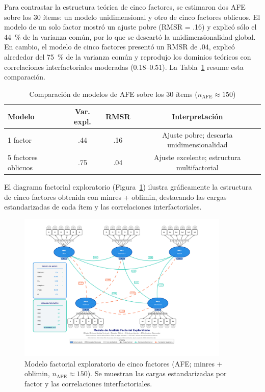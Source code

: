 Para contrastar la estructura teórica de cinco factores, se estimaron dos AFE sobre los 30 ítems: un modelo unidimensional y otro de cinco factores oblicuos. El modelo de un solo factor mostró un ajuste pobre (RMSR = .16) y explicó sólo el 44 \% de la varianza común, por lo que se descartó la unidimensionalidad global. En cambio, el modelo de cinco factores presentó un RMSR de .04, explicó alrededor del 75 \% de la varianza común y reprodujo los dominios teóricos con correlaciones interfactoriales moderadas (0.18–0.51). La Tabla \ref{tab:efa-comparacion} resume esta comparación.

\begin{table}[htbp]
\centering
\caption{Comparación de modelos de AFE sobre los 30 ítems ($n_{\text{AFE}}\approx150$)}
\label{tab:efa-comparacion}
\small
\begin{tabular}{@{}lccc@{}}
\toprule
\textbf{Modelo} & \textbf{Var. expl.} & \textbf{RMSR} & \textbf{Interpretación} \\
\midrule
1 factor                & .44 & .16 & Ajuste pobre; descarta unidimensionalidad \\
5 factores oblicuos     & .75 & .04 & Ajuste excelente; estructura multifactorial \\
\bottomrule
\end{tabular}
\end{table}

El diagrama factorial exploratorio (Figura~\ref{fig:afe}) ilustra gráficamente la estructura de cinco factores obtenida con minres + oblimin, destacando las cargas estandarizadas de cada ítem y las correlaciones interfactoriales.

\begin{figure}[htbp]
\centering
\includegraphics[width=0.9\textwidth]{figures/Diagrama_AFE_CORRECTO_FINAL.pdf}
\caption{Modelo factorial exploratorio de cinco factores (AFE; minres + oblimin, $n_{\text{AFE}}\approx150$). Se muestran las cargas estandarizadas por factor y las correlaciones interfactoriales.}
\label{fig:afe}
\end{figure}

